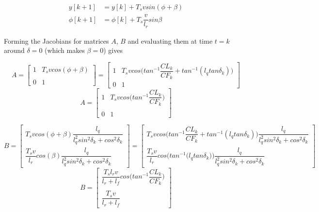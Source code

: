 \documentclass[oneside,12pt]{article}
\begin{document}
    \begin{align}
      y[k+1] &= y[k] + T_s v sin(\phi + \beta) \\
      \phi[k+1] &= \phi[k] + T_s \dfrac{v}{l_r} sin\beta
    \end{align}

    Forming the Jacobians for matrices $A$, $B$ and evaluating them at time
    $t=k$ around $\delta = 0$ (which makes $\beta = 0$) gives

    \begin{equation}
     A =
      \begin{bmatrix}
        1 & T_s v cos(\phi + \beta) \\\\
        0 & 1
      \end{bmatrix}
      =
      \begin{bmatrix}
        1 & T_s v cos\Big(tan^{-1}\dfrac{CL_k}{CF_k} + tan^{-1} (l_q tan\delta_k)\Big) \\
        0 & 1
      \end{bmatrix}
    \end{equation}
    \begin{equation}
     A =
      \begin{bmatrix}
        1 & T_s v cos\Big(tan^{-1}\dfrac{CL_k}{CF_k}\Big) \\\\
        0 & 1
      \end{bmatrix}
    \end{equation}

    \begin{equation}
     B =
      \begin{bmatrix}
        T_s v cos(\phi + \beta) \dfrac{l_q}{l_q^2 sin^2\delta_k + cos^2\delta_k} \\
        \dfrac{T_s v}{l_r} cos(\beta) \dfrac{l_q}{l_q^2 sin^2\delta_k + cos^2\delta_k}
      \end{bmatrix}
      =
      \begin{bmatrix}
        T_s v cos\Big(tan^{-1}\dfrac{CL_k}{CF_k} + tan^{-1} (l_q tan\delta_k)\Big) \dfrac{l_q}{l_q^2 sin^2\delta_k + cos^2\delta_k} \\
        \dfrac{T_s v}{l_r} cos\Bigg(tan^{-1} \Big(l_q tan\delta_k\Big)\Bigg) \dfrac{l_q}{l_q^2 sin^2\delta_k + cos^2\delta_k}
      \end{bmatrix}
    \end{equation}
    \begin{equation}
     B =
      \begin{bmatrix}
        \dfrac{T_s l_r v}{l_r + l_f} cos\Big(tan^{-1}\dfrac{CL_k}{CF_k}\Big) \\\\
        \dfrac{T_s v}{l_r+l_f}
      \end{bmatrix}
    \end{equation}
\end{document}

